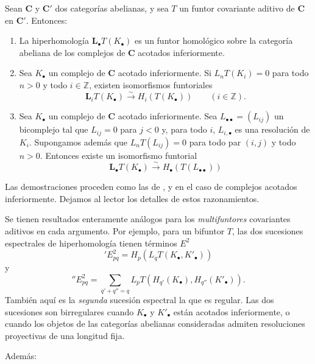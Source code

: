 \begin{proposition}[11.6.3]
\label{0.11.6.3}
\label{0.11.6.3-fr}
Sean $\boldsymbol{C}$ y $\boldsymbol{C}'$ dos categorías abelianas, y sea $T$ un funtor covariante aditivo de $\boldsymbol{C}$ en $\boldsymbol{C}'$.
Entonces:
\begin{enumerate}
  \item[{\rm(i)}] {La hiperhomología $\mathbf{L}_\bullet T(K_\bullet)$ es un funtor homológico sobre la categoría abeliana de los complejos de $\boldsymbol{C}$ acotados inferiormente.}

  \item[{\rm(ii)}] {Sea $K_\bullet$ un complejo de $\boldsymbol{C}$ acotado inferiormente.
  Si $L_nT(K_i)=0$ para todo $n>0$ y todo $i\in\mathbb Z$, existen isomorfismos funtoriales}
  \[
\label{0.11.6.3.1-fr}
\tag{11.6.3.1}
\mathbf{L}_iT(K_\bullet)\xrightarrow{\sim} H_i(T(K_\bullet))\qquad(i\in\mathbb Z).
\]

  \item[{\rm(iii)}] {Sea $K_\bullet$ un complejo de $\boldsymbol{C}$ acotado inferiormente.
  Sea $L_{\bullet\bullet}=(L_{ij})$ un bicomplejo tal que $L_{ij}=0$ para $j<0$ y, para todo $i$, $L_{i,\bullet}$ es una resolución de $K_i$.
  Supongamos además que $L_nT(L_{ij})=0$ para todo par $(i,j)$ y todo $n>0$.
  Entonces existe un isomorfismo funtorial}
  \[
\label{0.11.6.3.2-fr}
\tag{11.6.3.2}
\mathbf{L}_\bullet T(K_\bullet)\xrightarrow{\sim} H_\bullet(T(L_{\bullet\bullet}))
\]
\end{enumerate}

\upshape Las demostraciones proceden como las de ,  y  en el caso de complejos acotados inferiormente.
Dejamos al lector los detalles de estos razonamientos.
\end{proposition}

\begin{env}[11.6.4]
\label{0.11.6.4}
\label{0.11.6.4-fr}
Se tienen resultados enteramente análogos para los \emph{multifuntores} covariantes aditivos en cada argumento.
Por ejemplo, para un bifuntor $T$, las dos sucesiones espectrales de hiperhomología tienen términos $E^2$
\[
\label{0.11.6.4.1-fr}
\tag{11.6.4.1}
{}'E^2_{pq}=H_p(L_qT(K_\bullet,K'_\bullet))
\]
y
\[
\label{0.11.6.4.2-fr}
\tag{11.6.4.2}
{}''E^2_{pq}=
\sum_{q'+q''=q}L_pT(H_{q'}(K_\bullet),H_{q''}(K'_\bullet)).
\]
También aquí es la \emph{segunda} sucesión espectral la que es regular.
Las dos sucesiones son birregulares cuando $K_\bullet$ y $K'_\bullet$ están acotados inferiormente, o cuando los objetos de las categorías abelianas consideradas admiten resoluciones proyectivas de una longitud fija.

Además:
\end{env}

